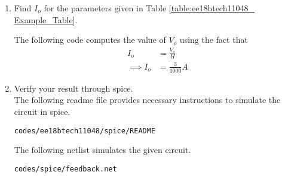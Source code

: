 \begin{enumerate}[label=\arabic*.,ref=\theenumi]
\begin{table}[!ht]
\centering

\caption{}
\label{table:ee18btech11048_ Input_Table}
\end{table}


\item Find $I_o$ for the parameters given in  Table  \ref{table:ee18btech11048_ Example_Table}.
\begin{table}[!ht]
\centering

\caption{}
\label{table:ee18btech11048_ Example_Table}
\end{table}
\solution  The following code computes the value of $V_o$ using the fact that
\begin{align}
I_o &= \frac{V_s}{H}\\
\implies I_o &= \frac{3}{1000} A
\end{align}
\item Verify your result through spice.
\\
\solution The following readme file provides necessary instructions to simulate the circuit in spice.
\begin{lstlisting}
codes/ee18btech11048/spice/README
\end{lstlisting}

The following netlist simulates the given circuit.
\begin{lstlisting}
codes/spice/feedback.net
\end{lstlisting}

\end{enumerate}
